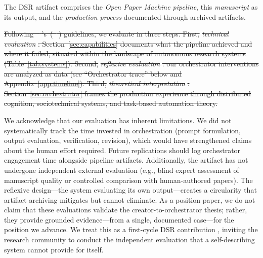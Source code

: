 \documentclass{article}
\providecommand{\DIFdeltex}[1]{{\protect\color{red}\sout{#1}}}                      %
\providecommand{\DIFdelbegin}{} %
\providecommand{\DIFdelend}{} %
\providecommand{\DIFdel}[1]{\texorpdfstring{\DIFdeltex{#1}}{}} %
\newcommand{\DIFscaledelfig}{0.5}
\newlength{\DIFdelgraphicswidth} %
\newlength{\DIFdelgraphicsheight} %
\newcommand{\DIFdelincludegraphics}[2][]{%
\sbox{\DIFdelgraphicsbox}{\DIFOincludegraphics[#1]{#2}}%
\settoboxwidth{\DIFdelgraphicswidth}{\DIFdelgraphicsbox} %
\settoboxtotalheight{\DIFdelgraphicsheight}{\DIFdelgraphicsbox} %
\scalebox{\DIFscaledelfig}{%
\parbox[b]{\DIFdelgraphicswidth}{\usebox{\DIFdelgraphicsbox}\\[-\baselineskip] \rule{\DIFdelgraphicswidth}{0em}}\llap{\resizebox{\DIFdelgraphicswidth}{\DIFdelgraphicsheight}{%
\setlength{\unitlength}{\DIFdelgraphicswidth}%
\begin{picture}(1,1)%
\thicklines\linethickness{2pt} %
{\color[rgb]{1,0,0}\put(0,0){\framebox(1,1){}}}%
{\color[rgb]{1,0,0}\put(0,0){\line( 1,1){1}}}%
{\color[rgb]{1,0,0}\put(0,1){\line(1,-1){1}}}%
\end{picture}%
}\hspace*{3pt}}} %
} %
\DeclareRobustCommand{\DIFdelbegin}{\DIFOdelbegin \let\includegraphics\DIFdelincludegraphics} %
\DeclareRobustCommand{\DIFdelend}{\DIFOaddend \let\includegraphics\DIFOincludegraphics} %
\begin{document}
The DSR artifact comprises the \textit{Open Paper Machine pipeline}, this \textit{manuscript} as its output, and the \textit{production process} documented through archived artifacts.

\DIFdelbegin \DIFdel{Following \mbox{%
\citeauthor{hevner2004design}}\hskip0pt%
's~(\mbox{%
\citeyear{hevner2004design}}\hskip0pt%
) guidelines, we evaluate in three steps. First, }\textit{\DIFdel{technical evaluation}}%
\DIFdel{: Section~\ref{sec:capabilities} documents what the pipeline achieved and where it failed, situated within the landscape of autonomous research systems (Table~\ref{tab:systems}). Second, }\textit{\DIFdel{reflexive evaluation}}%
\DIFdel{: our orchestrator interventions are analyzed as data (see ``Orchestrator trace'' below and Appendix~\ref{app:timeline}). Third, }\textit{\DIFdel{theoretical interpretation}}%
\DIFdel{: Section~\ref{sec:orchestrator} frames the production experience through distributed cognition, sociotechnical systems, and task-based automation theory.
}\DIFdelend %

We acknowledge that our evaluation has inherent limitations. We did not systematically track the time invested in orchestration (prompt formulation, output evaluation, verification, revision), which would have strengthened claims about the human effort required. Future replications should log orchestrator engagement time alongside pipeline artifacts. Additionally, the artifact has not undergone independent external evaluation (e.g., blind expert assessment of manuscript quality or controlled comparison with human-authored papers). The reflexive design---the system evaluating its own output---creates a circularity that artifact archiving mitigates but cannot eliminate. As a position paper, we do not claim that these evaluations validate the creator-to-orchestrator thesis; rather, they provide grounded evidence---from a single, documented case---for the position we advance. We treat this as a first-cycle DSR contribution \citep{hevner2004design}, inviting the research community to conduct the independent evaluation that a self-describing system cannot provide for itself.

\end{document}
